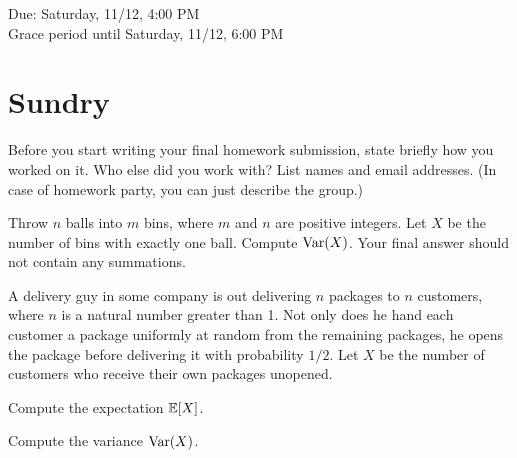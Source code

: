 \documentclass[11pt]{article}
\begin{document}
\maketitle
\fontsize{12}{15}\selectfont

\begin{center}
    Due: Saturday, 11/12, 4:00 PM \\
    Grace period until Saturday, 11/12, 6:00 PM \\
\end{center}

\section*{Sundry}
Before you start writing your final homework submission, state briefly how you worked on it.  Who else did you work with?  List names and email addresses.  (In case of homework party, you can just describe the group.)

\vspace{15pt}


Throw $n$ balls into $m$ bins, where $m$ and $n$ are positive integers. Let $X$ be the number of bins with exactly one ball. Compute $\operatorname{Var} (X)$. Your final answer should not contain any summations.


A delivery guy in some company is out delivering $n$ packages to $n$ customers, where $n$ is a natural number greater than 1.
Not only does he hand each customer a package uniformly at random from the remaining packages, he opens the package before delivering it with probability $1/2$.
Let $X$ be the number of customers who receive their own packages unopened. 

\begin{Parts}

\Part Compute the expectation $\operatorname{\mathbb{E}}[X]$.

\Part Compute the variance $\operatorname{Var}(X)$.

\end{Parts}

\end{document}
